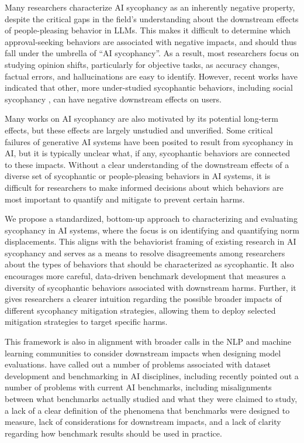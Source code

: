 Many researchers characterize AI sycophancy as an inherently negative property, despite the critical gaps in the field's understanding about the downstream effects of people-pleasing behavior in LLMs. This makes it difficult to determine which approval-seeking behaviors are associated with negative impacts, and should thus fall under the umbrella of ``AI sycophancy''. As a result, most researchers focus on studying opinion shifts, particularly for objective tasks, as accuracy changes, factual errors, and hallucinations are easy to identify. However, recent works have indicated that other, more under-studied sycophantic behaviors, including social sycophancy \cite{cheng2026sycophantic}, can have negative downstream effects on users.  %

Many works on AI sycophancy are also motivated by its potential long-term effects, but these effects are largely unstudied and unverified. Some critical failures of generative AI systems have been posited to result from sycophancy in AI, but it is typically unclear what, if any, sycophantic behaviors are connected to these impacts.
Without a clear understanding of the downstream effects of a diverse set of sycophantic or people-pleasing behaviors in AI systems, it is difficult for researchers to make informed decisions about which behaviors are most important to quantify and mitigate to prevent certain harms.

We propose a standardized, bottom-up approach to characterizing and evaluating sycophancy in AI systems, where the focus is on identifying and quantifying norm displacements. This aligns with the behaviorist framing of existing research in AI sycophancy and serves as a means to resolve disagreements among researchers about the types of behaviors that should be characterized as sycophantic. It also encourages more careful, data-driven benchmark development that measures a diversity of sycophantic behaviors associated with downstream harms. Further, it gives researchers a clearer intuition regarding the possible broader impacts of different sycophancy mitigation strategies, allowing them to deploy selected mitigation strategies to target specific harms.

This framework is also in alignment with broader calls in the NLP and machine learning communities to consider downstream impacts when designing model evaluations. \citet{paullada2021data} have called out a number of problems associated with dataset development and benchmarking in AI disciplines, including  \citet{eriksson2025can} recently pointed out a number of problems with current AI benchmarks, including misalignments between what benchmarks actually studied and what they were claimed to study, a lack of a clear definition of the phenomena that benchmarks were designed to measure, lack of considerations for downstream impacts, and a lack of clarity regarding how benchmark results should be used in practice. 

